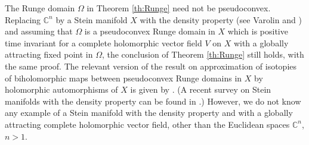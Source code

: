 \documentclass[12pt]{amsart}
\theoremstyle{definition}
\numberwithin{equation}{section}
\numberwithin{figure}{section}
\newcommand\C{\mathbb{C}}
\numberwithin{equation}{section}
\begin{document}
%
%
The Runge domain $\Omega$ in Theorem \ref{th:Runge}
need not be pseudoconvex. 
Replacing $\C^n$ by a Stein manifold $X$ with the density property
(see Varolin \cite{Varolin1999,Varolin2000} and 
\cite[Section 4.10]{Forstneric2017E}) and assuming 
that $\Omega$ is a pseudoconvex Runge domain in $X$
which is positive time invariant for a complete 
holomorphic vector field $V$ on $X$ with a globally attracting 
fixed point in $\Omega$, the conclusion of Theorem \ref{th:Runge} 
still holds, with the same proof. The relevant version of 
the result on approximation of isotopies of biholomorphic maps
between pseudoconvex Runge domains in $X$ by holomorphic
automorphisms of $X$ is given by
\cite[Theorem 4.10.5]{Forstneric2017E}.
(A recent survey on Stein manifolds with the density property
can be found in \cite[Sect.\ 2]{ForstnericKutzschebauch2022}.) 
However, we do not know any example of a 
Stein manifold with the density property
and with a globally attracting complete holomorphic vector field,
other than the Euclidean spaces $\C^n$, $n>1$.
\end{document}
